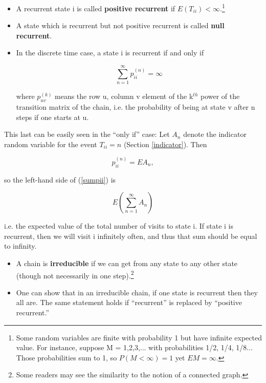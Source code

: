 \begin{itemize}

\item A recurrent state i is called \textbf{positive recurrent} if
$E(T_{ii})<\infty$.\footnote{Some random variables are finite with
probability 1 but have infinite expected value.  For instance, suppose M
= 1,2,3,... with probabilities 1/2, 1/4, 1/8...  Those probabilities sum
to 1, so $P(M < \infty) = 1$ yet $EM = \infty$.} 

\item A state which is recurrent but not positive recurrent is called
\textbf{null recurrent}. 

\item In the discrete time case, a state i is recurrent if
and only if

\begin{equation}
\label{sumpii}
\sum_{n=1}^{\infty} p_{ii}^{(n)} = \infty
\end{equation}

where $p_{uv}^{(k)}$ means the row u, column v element of the k$^{th}$
power of the transition matrix of the chain, i.e. the probability of
being at state v after n steps if one starts at u.

\end{itemize}

This last can be easily seen in the ``only if'' case:   Let $A_n$ denote the
indicator random variable for the event $T_{ii} = n$ (Section
\ref{indicator}).  Then 

\begin{equation}
p_{ii}^{(n)} = EA_n, 
\end{equation}

so the left-hand side of (\ref{sumpii}) is 

\begin{equation}
E \left ( \sum_{n=1}^{\infty} A_n \right )
\end{equation}

i.e. the expected value of the total number of visits to state i.  If
state i is recurrent, then we will visit i infinitely often, and thus
that sum should be equal to infinity.

\begin{itemize}

\item A chain is \textbf{irreducible} if we can get from any state to
any other state (though not necessarily in one step).\footnote{Some
readers may see the similarity to the notion of a connected graph.}  

\item One can show that in an irreducible chain, if one state is
recurrent then they all are.  The same statement holds if ``recurrent''
is replaced by ``positive recurrent.''

\end{itemize}


